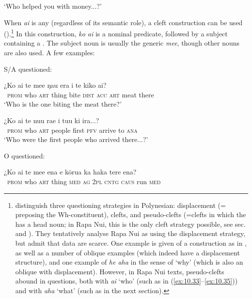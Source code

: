 \glt 
‘Who helped you with money...?’ \textstyleExampleref{[R621.024]} 
\z

When \textit{ai} is any  (regardless of its semantic role), a cleft construction can be used ().\footnote{\label{fn:487}\citet{PotsdamPolinsky2011} distinguish three questioning strategies in Polynesian: displacement (= preposing the Wh-constituent), clefts, and pseudo-clefts (=clefts in which the  has a head noun; in Rapa Nui, this is the only cleft strategy possible, see sec.  and ). They tentatively analyse Rapa Nui as using the displacement strategy, but admit that data are scarce. One example is given of a construction as in , as well as a number of oblique examples (which indeed have a displacement structure), and one example of \textit{he aha} in the sense of ‘why’ (which is also an oblique with displacement). However, in Rapa Nui texts, pseudo-clefts abound in questions, both with \textit{ai} ‘who’ (such as in (\ref{ex:10.33}–\ref{ex:10.35})) and with \textit{aha} ‘what’ (such as  in the next section).} In this construction, \textit{ko ai} is a nominal predicate, followed by a subject containing a . The subject noun is usually the generic \textit{me{\ꞌ}e}, though other nouns are also used. A few examples:

S/A questioned:

\ea\label{ex:10.33}
\gll ¿Ko ai te me{\ꞌ}e ŋau era i te kiko {\ꞌ}ai? \\
~\textsc{prom} who \textsc{art} thing bite \textsc{dist} \textsc{acc} \textsc{art} meat there \\

\glt 
‘Who is the one biting the meat there?’ \textstyleExampleref{[R416.1310]}
\z

\ea\label{ex:10.34}
\gll ¿Ko ai te nu{\ꞌ}u ra{\ꞌ}e i tu{\ꞌ}u ki ira...? \\
~\textsc{prom} who \textsc{art} people first \textsc{pfv} arrive to \textsc{ana} \\

\glt
‘Who were the first people who arrived there...?’ \textstyleExampleref{[R616.390]} 
\z

O questioned:

\ea\label{ex:10.35}
\gll ¿Ko ai te me{\ꞌ}e ena e kōrua ka haka tere ena?\\
~\textsc{prom} who \textsc{art} thing \textsc{med} \textsc{ag} \textsc{2pl} \textsc{cntg} \textsc{caus} run \textsc{med}\\

